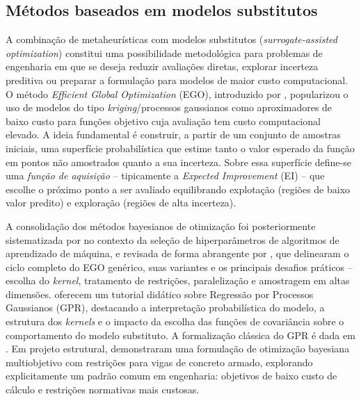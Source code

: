 \subsection{Métodos baseados em modelos substitutos}
\label{sec:soa_surrogates}

A combinação de metaheurísticas com modelos substitutos (\textit{surrogate-assisted optimization}) constitui uma possibilidade metodológica para problemas de engenharia em que se deseja reduzir avaliações diretas, explorar incerteza preditiva ou preparar a formulação para modelos de maior custo computacional. O método \textit{Efficient Global Optimization} (EGO), introduzido por , popularizou o uso de modelos do tipo \textit{kriging}/processos gaussianos como aproximadores de baixo custo para funções objetivo cuja avaliação tem custo computacional elevado. A ideia fundamental é construir, a partir de um conjunto de amostras iniciais, uma superfície probabilística que estime tanto o valor esperado da função em pontos não amostrados quanto a sua incerteza. Sobre essa superfície define-se uma \textit{função de aquisição} -- tipicamente a \textit{Expected Improvement} (EI) -- que escolhe o próximo ponto a ser avaliado equilibrando explotação (regiões de baixo valor predito) e exploração (regiões de alta incerteza).

A consolidação dos métodos bayesianos de otimização foi posteriormente sistematizada por  no contexto da seleção de hiperparâmetros de algoritmos de aprendizado de máquina, e revisada de forma abrangente por , que delinearam o ciclo completo do EGO genérico, suas variantes e os principais desafios práticos -- escolha do \textit{kernel}, tratamento de restrições, paralelização e amostragem em altas dimensões.  oferecem um tutorial didático sobre Regressão por Processos Gaussianos (GPR), destacando a interpretação probabilística do modelo, a estrutura dos \textit{kernels} e o impacto da escolha das funções de covariância sobre o comportamento do modelo substituto. A formalização clássica do GPR é dada em . Em projeto estrutural,  demonstraram uma formulação de otimização bayesiana multiobjetivo com restrições para vigas de concreto armado, explorando explicitamente um padrão comum em engenharia: objetivos de baixo custo de cálculo e restrições normativas mais custosas.

